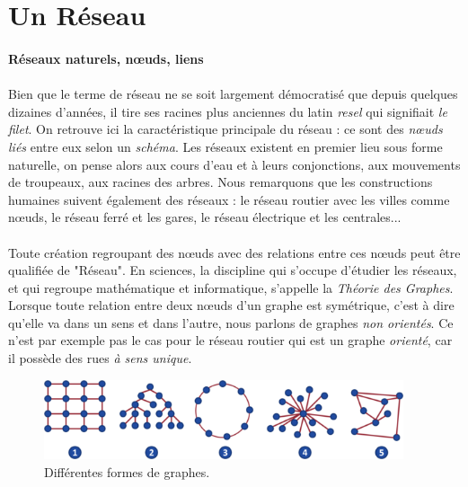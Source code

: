 \section{Un Réseau}

\paragraph{Réseaux naturels, n\oe{}uds, liens} \label{natural_networks}

\paragraph{} Bien que le terme de réseau ne se soit largement démocratisé que depuis quelques dizaines d'années, il tire ses
racines plus anciennes du latin \emph{resel} qui signifiait \emph{le filet}. On retrouve ici la caractéristique
principale du réseau : ce sont des \emph{n\oe{}uds liés} entre eux selon un \emph{schéma}. Les réseaux existent en
premier lieu sous forme naturelle, on pense alors aux cours d'eau et à leurs conjonctions, aux mouvements de troupeaux,
aux racines des arbres. Nous remarquons que les constructions humaines suivent également des réseaux : le réseau routier
avec les villes comme n\oe{}uds, le réseau ferré et les gares, le réseau électrique et les centrales...

\paragraph{} Toute création regroupant des n\oe{}uds avec des relations entre ces n\oe{}uds peut être qualifiée de "Réseau". En sciences,
la discipline qui s'occupe d'étudier les réseaux, et qui regroupe mathématique et informatique, s'appelle
la \emph{Théorie des Graphes}. Lorsque toute relation entre deux n\oe{}uds d'un graphe est symétrique, c'est à dire qu'elle va
dans un sens et dans l'autre, nous parlons de graphes \emph{non orientés}. Ce n'est par exemple pas le cas pour le
réseau routier qui est un graphe \emph{orienté}, car il possède des rues \emph{à sens unique}.

\begin{figure}[ht]
    \centering
    \includegraphics[width=400px]{chapters/02/images/reseaux.png}
    \caption{\label{network_graphs}Différentes formes de graphes.}
\end{figure}


